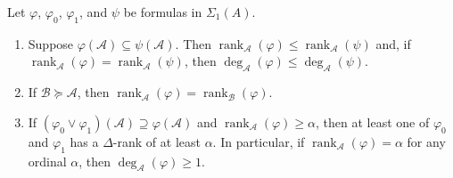 \documentclass{article}
\DeclareMathOperator{\rank}{rank}
\let\mc\mathcal
\begin{document}
\begin{lemma}\label{pRank}
    Let $\varphi$, $\varphi_0$, $\varphi_1$, and $\psi$ be formulas in $\Sigma_1(A)$.
    \begin{enumerate}
        \item Suppose $\varphi(\mc{A}) \subseteq \psi(\mc{A})$. Then $\rank_{\mc{A}}(\varphi) \leq \rank_{\mc{A}}(\psi)$ and, if $\rank_{\mc{A}}(\varphi) = \rank_{\mc{A}}(\psi)$, then $\deg_{\mc{A}}(\varphi) \leq \deg_{\mc{A}}(\psi)$.
        \item If $\mc{B} \succeq \mc{A}$, then $\rank_{\mc{A}}(\varphi) = \rank_{\mc{B}}(\varphi)$.
        \item If $(\varphi_0 \lor \varphi_1)(\mc{A}) \supseteq \varphi(\mc{A})$ and $\rank_{\mc{A}}(\varphi) \geq \alpha$, then at least one of $\varphi_0$ and $\varphi_1$ has a $\Delta$-rank of at least $\alpha$. In particular, if $\rank_{\mc{A}}(\varphi) = \alpha$ for any ordinal $\alpha$, then $\deg_{\mc{A}}(\varphi) \geq 1$.
    \end{enumerate}
\end{lemma}
\end{document}
